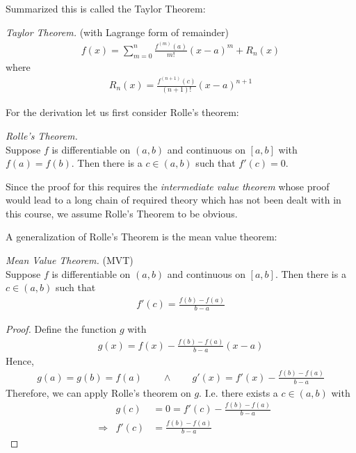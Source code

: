 Summarized this is called the Taylor Theorem:
\begin{tm}
	\emph{Taylor Theorem.} (with Lagrange form of remainder)
	\begin{align*}
	f(x) = \sum_{m=0}^n \frac{f^{(m)}(a)}{m!} (x-a)^m + R_n(x)
	\end{align*}
	where
	\begin{align*}
	R_n(x) = \frac{f^{(n+1)}(c)}{(n+1)!} (x-a)^{n+1}
	\end{align*}
\end{tm}

For the derivation let us first consider Rolle's theorem:

\begin{tm}
	\emph{Rolle's Theorem.} \\
	Suppose $f$ is differentiable on $(a,b)$ and continuous on $[a,b]$ with $f(a) = f(b)$. Then there is a $c \in (a,b)$ such that $f'(c) =0$.
\end{tm}

Since the proof for this requires the \emph{intermediate value theorem} whose proof would lead to a long chain of required theory which has not been dealt with in this course, we assume Rolle's Theorem to be obvious.

A generalization of Rolle's Theorem is the mean value theorem:
\begin{tm}
	\emph{Mean Value Theorem.} (MVT) \\
	Suppose $f$ is differentiable on $(a,b)$ and continuous on $[a,b]$. Then there is a $c \in (a,b)$ such that 
	\begin{align*}
	f'(c) = \frac{f(b) - f(a)}{b-a}
	\end{align*}
\end{tm}

\begin{proof}
	Define the function $g$ with
	\begin{align*}
	g(x) = f(x) - \frac{f(b)-f(a)}{b-a}(x-a)
	\end{align*}
	Hence,
	\begin{align*}
	g(a) = g(b) = f(a) \qquad \wedge \qquad g'(x) = f'(x) - \frac{f(b)- f(a)}{b-a}
	\end{align*}
	Therefore, we can apply Rolle's theorem on $g$. I.e. there exists a $c \in (a,b)$ with 
	\begin{align*}
	& & g(c) & = 0 = f'(c) - \frac{f(b)- f(a)}{b-a} \\
	& \Rightarrow & f'(c) & = \frac{f(b)- f(a)}{b-a}
	\end{align*}
\end{proof}

